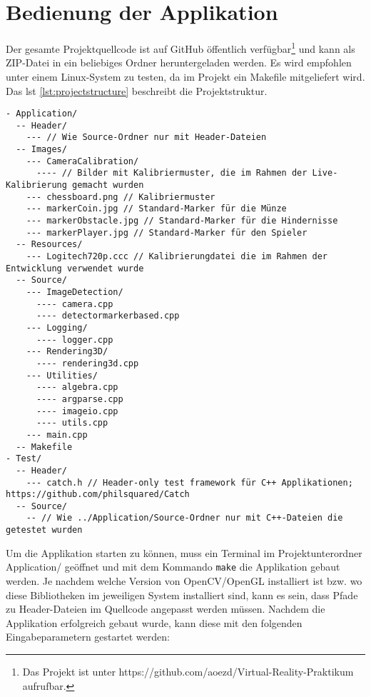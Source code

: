 
\section{Bedienung der Applikation}\label{sec:BedienungApplikation}
Der gesamte Projektquellcode ist auf GitHub öffentlich verfügbar\footnote{Das Projekt ist unter https://github.com/aoezd/Virtual-Reality-Praktikum aufrufbar.} und kann als ZIP-Datei in ein beliebiges Ordner heruntergeladen werden. Es wird empfohlen unter einem Linux-System zu testen, da im Projekt ein Makefile mitgeliefert wird. Das \acs{lst} \ref{lst:projectstructure} beschreibt die Projektstruktur.

\begin{lstlisting}[caption={Die Beschreibung der allgemeinen Projektstruktur}, label={lst:projectstructure}]
- Application/
  -- Header/
    --- // Wie Source-Ordner nur mit Header-Dateien
  -- Images/
    --- CameraCalibration/
      ---- // Bilder mit Kalibriermuster, die im Rahmen der Live-Kalibrierung gemacht wurden
    --- chessboard.png // Kalibriermuster
    --- markerCoin.jpg // Standard-Marker für die Münze
    --- markerObstacle.jpg // Standard-Marker für die Hindernisse
    --- markerPlayer.jpg // Standard-Marker für den Spieler
  -- Resources/
    --- Logitech720p.ccc // Kalibrierungdatei die im Rahmen der Entwicklung verwendet wurde
  -- Source/
    --- ImageDetection/
      ---- camera.cpp
      ---- detectormarkerbased.cpp
    --- Logging/
      ---- logger.cpp
    --- Rendering3D/
      ---- rendering3d.cpp
    --- Utilities/
      ---- algebra.cpp
      ---- argparse.cpp
      ---- imageio.cpp
      ---- utils.cpp
    --- main.cpp
  -- Makefile
- Test/
  -- Header/
    --- catch.h // Header-only test framework für C++ Applikationen; https://github.com/philsquared/Catch
  -- Source/
    -- // Wie ../Application/Source-Ordner nur mit C++-Dateien die getestet wurden
\end{lstlisting}

\noindent Um die Applikation starten zu können, muss ein Terminal im Projektunterordner \glqq Application/\grqq{} geöffnet und mit dem Kommando \glqq \texttt{make}\grqq{} die Applikation gebaut werden. Je nachdem welche Version von OpenCV/OpenGL installiert ist bzw. wo diese Bibliotheken im jeweiligen System installiert sind, kann es sein, dass Pfade zu Header-Dateien im Quellcode angepasst werden müssen. Nachdem die Applikation erfolgreich gebaut wurde, kann diese mit den folgenden Eingabeparametern gestartet werden:

